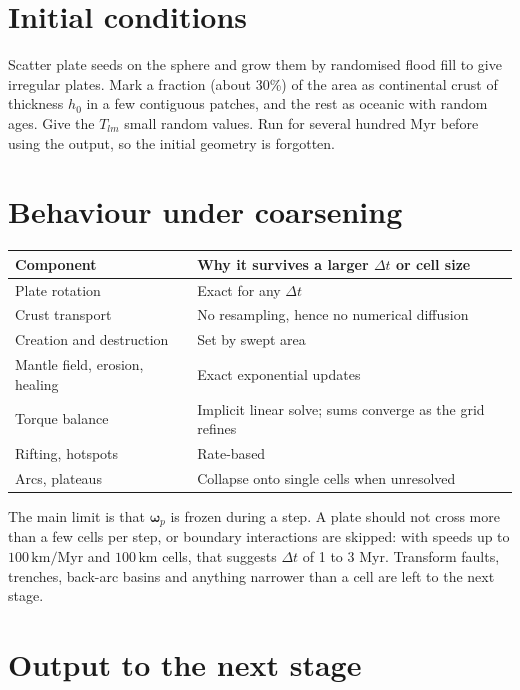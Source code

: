 \documentclass[11pt,a4paper]{article}
\newcommand{\vect}[1]{\bm{#1}}
\newcommand{\om}{\vect{\omega}}
\newcommand{\km}{\,\mathrm{km}}
\begin{document}
\section{Initial conditions}

Scatter plate seeds on the sphere and grow them by randomised flood fill to
give irregular plates. Mark a fraction (about 30\%) of the area as continental
crust of thickness $h_0$ in a few contiguous patches, and the rest as oceanic
with random ages. Give the $T_{lm}$ small random values. Run for several
hundred Myr before using the output, so the initial geometry is forgotten.

\section{Behaviour under coarsening}

\begin{table}[h]
\centering
\begin{tabularx}{\textwidth}{@{}lX@{}}
\toprule
Component & Why it survives a larger $\Delta t$ or cell size \\
\midrule
Plate rotation & Exact for any $\Delta t$ \\
Crust transport & No resampling, hence no numerical diffusion \\
Creation and destruction & Set by swept area \\
Mantle field, erosion, healing & Exact exponential updates \\
Torque balance & Implicit linear solve; sums converge as the grid refines \\
Rifting, hotspots & Rate-based \\
Arcs, plateaus & Collapse onto single cells when unresolved \\
\bottomrule
\end{tabularx}
\end{table}

The main limit is that $\om_p$ is frozen during a step. A plate should not
cross more than a few cells per step, or boundary interactions are skipped:
with speeds up to $100\km/\mathrm{Myr}$ and $100\km$ cells, that suggests
$\Delta t$ of 1 to 3 Myr. Transform faults, trenches, back-arc basins and
anything narrower than a cell are left to the next stage.

\section{Output to the next stage}
\end{document}
